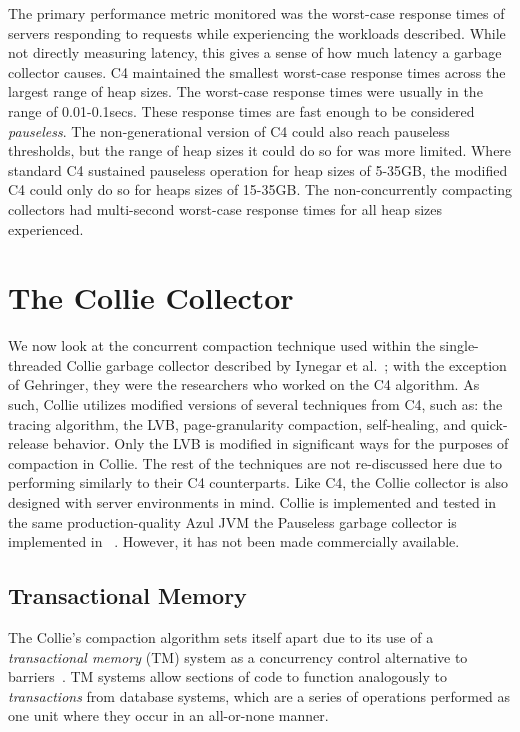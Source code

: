 \documentclass{sig-alternate}
\begin{document}
The primary performance metric monitored was the worst-case response times
of servers responding to requests while experiencing the workloads
described. While not directly measuring latency, this gives a sense of how 
much latency a garbage collector causes. 
C4 maintained the smallest 
worst-case response times across the largest range of heap sizes.
The worst-case response times were usually in the range of 0.01-0.1secs. 
These response times are fast enough to be considered \emph{pauseless}. 
The non-generational version of C4 could also reach pauseless thresholds,
but the range of heap sizes it could do so for was more limited. Where standard
C4 sustained pauseless operation for heap sizes of 5-35GB, the modified C4 could
only do so for heaps sizes of 15-35GB. The non-concurrently compacting
collectors had multi-second worst-case response times for all heap sizes experienced.


\section{The Collie Collector}
\label{sec:collie}

We now look at the concurrent compaction technique used within the single-threaded
Collie garbage collector described by Iynegar et al.~\cite{Iyengar:Collie};
with the exception of Gehringer, they were the researchers who worked on the C4 algorithm.
As such, Collie utilizes modified versions of several techniques from C4, such as:
the tracing algorithm, the LVB, page-granularity compaction, self-healing, and quick-release behavior.
Only the LVB is modified in significant ways for the purposes of compaction in Collie.
The rest of the techniques are not re-discussed here due to performing 
similarly to their C4 counterparts. Like C4, the Collie
collector is also designed with server environments in mind. 
Collie is implemented and tested in 
the same production-quality Azul JVM the Pauseless garbage collector is implemented in
~\cite{Click:Pauseless}. However, it has not been made commercially available.


\subsection{Transactional Memory}
\label{sec:collieTM}

The Collie's compaction algorithm sets itself apart due to its use 
of a \emph{transactional memory} (TM) system as a concurrency control 
alternative to barriers~\cite{Iyengar:Collie}. TM systems allow
sections of code to function 
analogously to \emph{transactions} from database systems, 
which are a series of operations performed as one unit where 
they occur in an all-or-none manner.
\end{document}
